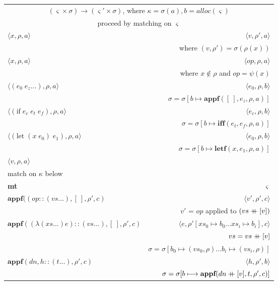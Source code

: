 \documentclass[12pt,draft]{article}
\newcommand\mdoubleplus{\ensuremath{\mathbin{+\mkern-9mu+}}}
\begin{document}
\begin{center}
\begin{tabular}{l | r}
\multicolumn{2}{c}{$(\varsigma \times \sigma) \rightarrow (\varsigma' \times \sigma)$, 
where $\kappa = \sigma(a) , b = alloc(\varsigma) $} \\
\multicolumn{2}{c}{proceed by matching on $\varsigma$} \\
\hline
$\langle x , \rho , a \rangle$ 
& $\langle v , \rho' , a \rangle$ \\
& where $(v , \rho') = \sigma(\rho(x))$ \\
\hline
$\langle x , \rho , a \rangle$ 
& $\langle op , \rho , a \rangle$ \\
& where $x \not\in \rho$ and $ op = \psi(x) $ \\
\hline
$\langle (e_0 \; e_z ...) , \rho , a \rangle$ 
& $\langle e_0 , \rho , b \rangle$ \\
& $ \sigma = \sigma[b \longmapsto \textbf{appf}([\:], e_z , \rho , a)]$ \\
\hline
$\langle (\text{if} \; e_c \; e_t \; e_f) , \rho , a \rangle$ 
& $\langle e_c , \rho , b \rangle$ \\
& $ \sigma = \sigma[b \longmapsto \textbf{iff}(e_t , e_f , \rho , a)] $ \\
\hline
$ \langle (\text{let} \;(x \;e_0)\; e_1) , \rho , a\rangle $
& $ \langle e_0 , \rho , b \rangle $ \\
& $ \sigma = \sigma[b \longmapsto \textbf{letf}(x , e_1 , \rho , a)] $ \\
\hline
$\langle v , \rho , a \rangle$ & \\
match on $\kappa$ below \\
\hline
\textbf{mt}
& $\varsigma$ \\
\hline
$\textbf{appf}((op :: (vs...) , [\:] , \rho' , c) $ 
& $ \langle v' , \rho' , c \rangle $ \\ 
& $ v' $ = $op$ applied to $(vs \mdoubleplus [v])$ \\
\hline
$ \textbf{appf}((\lambda (xs ...) e) :: (vs...) , [\:] , \rho' , c) $
& $ \langle e , \rho'[xs_0 \longmapsto b_0 ... xs_i \longmapsto b_i] , c \rangle $ \\
& $ vs = vs \mdoubleplus [v]$\\
& $\sigma = \sigma[b_0 \mapsto (vs_0, \rho) ... b_i \mapsto (vs_i, \rho)] $ \\
\hline
$\textbf{appf}(dn , h::(t...) , \rho' , c) $
& $ \langle h , \rho' , b \rangle $ \\
& $ \sigma = \sigma[b \longmapsto \textbf{appf}(dn \mdoubleplus	 [v] , t , \rho' , c)] $ \\

\end{tabular}
\end{center}
\end{document}
